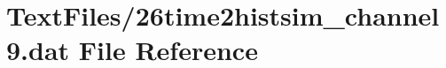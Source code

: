 \hypertarget{26time2histsim__channel9_8dat}{}\section{Text\+Files/26time2histsim\+\_\+channel9.dat File Reference}
\label{26time2histsim__channel9_8dat}
